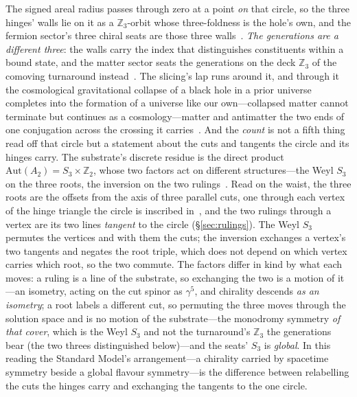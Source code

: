 \documentclass[11pt,a4paper]{article}
\theoremstyle{definition}
\begin{document}
\begin{enumerate}
The signed areal radius passes through zero at a point \emph{on} that circle, so the three hinges' walls lie on it as a $\mathbb{Z}_3$-orbit whose three-foldness is the hole's own, and the fermion sector's three chiral seats are those three walls~\cite{JanzenMatter}. \emph{The generations are a different three}: the walls carry the index that distinguishes constituents within a bound state, and the matter sector seats the generations on the deck $\mathbb{Z}_3$ of the comoving turnaround instead~\cite{JanzenMatter}. The slicing's lap runs around it, and through it the cosmological gravitational collapse of a black hole in a prior universe completes into the formation of a universe like our own---collapsed matter cannot terminate but continues as a cosmology---matter and antimatter the two ends of one conjugation across the crossing it carries~\cite{JanzenCRframework,JanzenBoundary}. And the \emph{count} is not a fifth thing read off that circle but a statement about the cuts and tangents the circle and its hinges carry. The substrate's discrete residue is the direct product $\mathrm{Aut}(A_{2})=S_{3}\times\mathbb{Z}_{2}$, whose two factors act on different structures---the Weyl $S_{3}$ on the three roots, the inversion on the two rulings~\cite{JanzenAlgebroid}. Read on the waist, the three roots are the offsets from the axis of three parallel cuts, one through each vertex of the hinge triangle the circle is inscribed in~\cite{JanzenSlicing}, and the two rulings through a vertex are its two lines \emph{tangent} to the circle (\S\ref{sec:rulings}). The Weyl $S_{3}$ permutes the vertices and with them the cuts; the inversion exchanges a vertex's two tangents and negates the root triple, which does not depend on which vertex carries which root, so the two commute. The factors differ in kind by what each moves: a ruling is a line of the substrate, so exchanging the two is a motion of it---an isometry, acting on the cut spinor as $\gamma^{5}$, and chirality descends \emph{as an isometry}; a root labels a different cut, so permuting the three moves through the solution space and is no motion of the substrate---the
monodromy symmetry \emph{of that cover}, which is the Weyl $S_3$ and not the turnaround's $\mathbb{Z}_3$ the generations bear (the two threes distinguished below)---and the seats' $S_3$ is \emph{global}. In this reading the Standard Model's arrangement---a chirality carried by spacetime symmetry beside a global flavour symmetry---is the difference between relabelling the cuts the hinges carry and exchanging the tangents to the one circle.


\end{enumerate}
\end{document}
